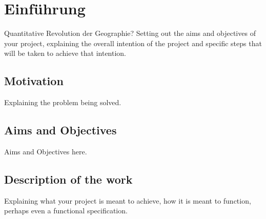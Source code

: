 \chapter{Einführung} %

Quantitative Revolution der Geographie?
Setting out the aims and objectives of your project, explaining the overall intention of the project and specific steps that will be taken to achieve that intention.

\section{Motivation}

Explaining the problem being solved.


\section{Aims and Objectives}

Aims and Objectives here.


\section{Description of the work}

Explaining what your project is meant to achieve, how it is meant to function, perhaps even a functional specification.


